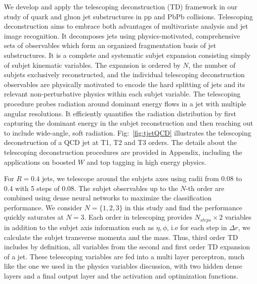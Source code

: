 \documentclass[notoc]{JHEP3}
\begin{document}
We develop and apply the telescoping deconstruction (TD) framework in our study of quark and gluon jet substructures in pp and PbPb collisions. Telescoping deconstruction aims to embrace both advantages of multivariate analysis and jet image recognition. It decomposes jets using physics-motivated, comprehensive sets of observables which form an organized fragmentation basis of jet substructures. It is a complete and systematic subjet expansion consisting simply of subjet kinematic variables. The expansion is ordered by $N$, the number of subjets exclusively reconstructed, and the individual telescoping deconstruction observables are physically motivated to encode the hard splitting of jets and its relevant non-perturbative physics within each subjet variable. The telescoping procedure probes radiation around dominant energy flows in a jet with multiple angular resolutions. It efficiently quantifies the radiation distribution by first capturing the dominant energy in the subjet reconstruction and then reaching out to include wide-angle, soft radiation. Fig:~\ref{fig:tjetQCD} illustrates the telescoping deconstruction of a QCD jet at T1, T2 and T3 orders. The details about the telescoping deconstruction procedures are provided in Appendix, including the applications on boosted $W$ and top tagging in high energy physics.

For $R=0.4$ jets, we telescope around the subjets axes using radii from 0.08 to 0.4 with 5 steps of 0.08. The subjet observables up to the $N$-th order are combined using dense neural networks to maximize the classification performance. We consider $N=\{1,2,3\}$ in this study and find the performance quickly saturates at $N=3$. Each order in telescoping provides $N_{steps} \times 2$ variables in addition to the subjet axis information such as $\eta, \phi$, i.e for each step in $\Delta r$, we calculate the subjet transverse momenta and the mass. Thus, third order TD includes by definition, all variables from the second and first order TD expansion of a jet. These telescoping variables are fed into a multi layer perceptron, much like the one we used in the physics variables discussion, with two hidden dense layers and a final output layer and the activation and optimization functions. 
\end{document}
